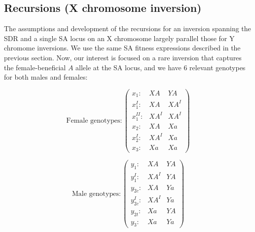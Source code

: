 \documentclass{article}
\begin{document}
\subsection{Recursions (X chromosome inversion)}

The assumptions and development of the recursions for an inversion spanning the SDR and a single SA locus on an X chromosome largely parallel those for Y chromome inversions. We use the same SA fitness expressions described in the previous section. Now, our interest is focused on a rare inversion that captures the female-beneficial $A$ allele at the SA locus, and we have $6$ relevant genotypes for both males and females:

\begin{equation*}
	\text{Female genotypes}:\left( \begin{array}{cc|c}
		x_1:        & XA   & YA \\
		x^I_{1}:    & XA   & XA^I \\
		x^{II}_{1}: & XA^I & XA^I \\
		x_{2}:      & XA   & Xa \\
		x^I_{2}:    & XA^I & Xa \\
		x_{3}:      & Xa   & Xa 
	\end{array} \right)
\end{equation*}

\begin{equation*}
	\text{Male genotypes}:\left( \begin{array}{cc|c}
		y_1:      & XA   & YA \\
		y^I_{1}:  & XA^I & YA \\
		y_{2c}:   & XA   & Ya \\
		y^I_{2c}: & XA^I & Ya \\
		y_{2t}:   & Xa & YA \\
		y_{3}:    & Xa & Ya 
	\end{array} \right)
\end{equation*}
\end{document}
